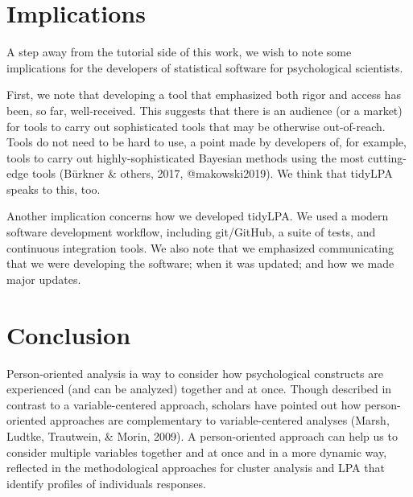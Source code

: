 \documentclass[man]{apa6}
\begin{document}
\hypertarget{implications}{%
\section{Implications}\label{implications}}

A step away from the tutorial side of this work, we wish to note some implications
for the developers of statistical software for psychological scientists.

First, we note that developing a tool that emphasized both rigor and access has
been, so far, well-received. This suggests that there is an audience (or a
market) for tools to carry out sophisticated tools that may be otherwise
out-of-reach. Tools do not need to be hard to use, a point made by developers
of, for example, tools to carry out highly-sophisticated Bayesian methods using
the most cutting-edge tools (Bürkner \& others, 2017, @makowski2019). We think
that tidyLPA speaks to this, too.

Another implication concerns how we developed tidyLPA. We used a modern software
development workflow, including git/GitHub, a suite of tests, and continuous
integration tools. We also note that we emphasized communicating that we were
developing the software; when it was updated; and how we made major updates.

\hypertarget{conclusion}{%
\section{Conclusion}\label{conclusion}}

Person-oriented analysis ia way to consider how psychological constructs are
experienced (and can be analyzed) together and at once. Though described in
contrast to a variable-centered approach, scholars have pointed out how
person-oriented approaches are complementary to variable-centered analyses
(Marsh, Ludtke, Trautwein, \& Morin, 2009). A person-oriented approach can help
us to consider multiple variables together and at once and in a more dynamic
way, reflected in the methodological approaches for cluster analysis and LPA
that identify profiles of individuals responses.
\end{document}
